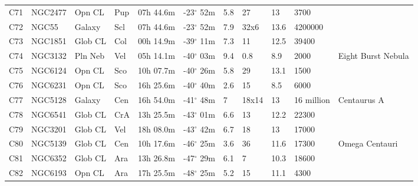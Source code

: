 \documentclass[10pt,twoside,a4paper,english]{article}
\begin{document}
\begin{longtable}{@{}lllllllllll@{}}
C71        & NGC2477     & Opn CL     & Pup       & 07h 44.6m & -23$^{\circ}$ 52m  & 5.8       & 27                   & 13       & 3700                &                                 \\ 
C72        & NGC55       & Galaxy     & Scl       & 07h 44.6m & -23$^{\circ}$ 52m  & 7.9       & 32x6                 & 13.6     & 4200000             &                                 \\ 
C73        & NGC1851     & Glob CL    & Col       & 00h 14.9m & -39$^{\circ}$ 11m  & 7.3       & 11                   & 12.5     & 39400               &                                 \\ 
C74        & NGC3132     & Pln Neb    & Vel       & 05h 14.1m & -40$^{\circ}$ 03m  & 9.4       & 0.8                  & 8.9      & 2000                & Eight Burst Nebula              \\ 
C75        & NGC6124     & Opn CL     & Sco       & 10h 07.7m & -40$^{\circ}$ 26m  & 5.8       & 29                   & 13.1     & 1500                &                                 \\ 
C76        & NGC6231     & Opn CL     & Sco       & 16h 25.6m & -40$^{\circ}$ 40m  & 2.6       & 15                   & 8.5      & 6000                &                                 \\ 
C77        & NGC5128     & Galaxy     & Cen       & 16h 54.0m & -41$^{\circ}$ 48m  & 7         & 18x14                & 13       & 16 million          & Centaurus A                     \\ 
C78        & NGC6541     & Glob CL    & CrA       & 13h 25.5m & -43$^{\circ}$ 01m  & 6.6       & 13                   & 12.2     & 22300               &                                 \\ 
C79        & NGC3201     & Glob CL    & Vel       & 18h 08.0m & -43$^{\circ}$ 42m  & 6.7       & 18                   & 13       & 17000               &                                 \\ 
C80        & NGC5139     & Glob CL    & Cen       & 10h 17.6m & -46$^{\circ}$ 25m  & 3.6       & 36                   & 11.6     & 17300               & Omega Centauri                  \\ 
C81        & NGC6352     & Glob CL    & Ara       & 13h 26.8m & -47$^{\circ}$ 29m  & 6.1       & 7                    & 10.3     & 18600               &                                 \\ 
C82        & NGC6193     & Opn CL     & Ara       & 17h 25.5m & -48$^{\circ}$ 25m  & 5.2       & 15                   & 11.1     & 4300                &                                 \\ 

\end{longtable}
\end{document}
